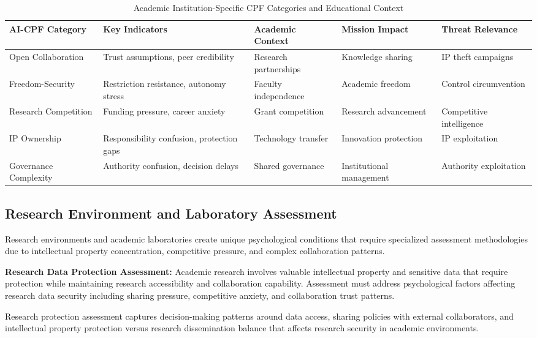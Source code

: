 \documentclass[10pt, twocolumn]{article}
\begin{document}
\begin{table*}[t]
\caption{Academic Institution-Specific CPF Categories and Educational Context}
\label{tab:academic_cpf_categories}
\centering
\small
\begin{tabular}{@{}p{3.0cm} p{2.8cm} p{2.6cm} p{2.8cm} p{2.8cm}@{}}
\toprule
\textbf{AI-CPF Category} & \textbf{Key Indicators} & \textbf{Academic Context} & \textbf{Mission Impact} & \textbf{Threat Relevance} \\
\midrule
Open Collaboration & Trust assumptions, peer credibility & Research partnerships & Knowledge sharing & IP theft campaigns \\
\midrule
Freedom-Security & Restriction resistance, autonomy stress & Faculty independence & Academic freedom & Control circumvention \\
\midrule
Research Competition & Funding pressure, career anxiety & Grant competition & Research advancement & Competitive intelligence \\
\midrule
IP Ownership & Responsibility confusion, protection gaps & Technology transfer & Innovation protection & IP exploitation \\
\midrule
Governance Complexity & Authority confusion, decision delays & Shared governance & Institutional management & Authority exploitation \\
\bottomrule
\end{tabular}
\end{table*}

\subsection{Research Environment and Laboratory Assessment}

Research environments and academic laboratories create unique psychological conditions that require specialized assessment methodologies due to intellectual property concentration, competitive pressure, and complex collaboration patterns.

\textbf{Research Data Protection Assessment:} Academic research involves valuable intellectual property and sensitive data that require protection while maintaining research accessibility and collaboration capability. Assessment must address psychological factors affecting research data security including sharing pressure, competitive anxiety, and collaboration trust patterns.

Research protection assessment captures decision-making patterns around data access, sharing policies with external collaborators, and intellectual property protection versus research dissemination balance that affects research security in academic environments.
\end{document}
